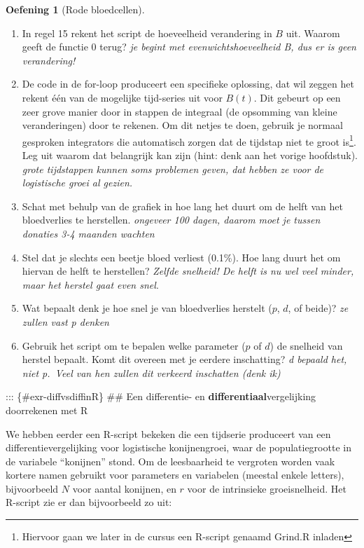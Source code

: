 \documentclass[
  a4paper,
]{scrbook}
\providecommand{\tightlist}{%
  \setlength{\itemsep}{0pt}\setlength{\parskip}{0pt}}\usepackage{longtable,booktabs,array}
\theoremstyle{definition}
\newtheorem{exercise}{Oefening}[chapter]
\theoremstyle{remark}
\begin{document}
\begin{exercise}[Rode
bloedcellen]
\begin{enumerate}
\def\labelenumi{\alph{enumi}.}
\setcounter{enumi}{7}
\tightlist
\item
  In regel 15 rekent het script de hoeveelheid verandering in \(B\) uit.
  Waarom geeft de functie \(0\) terug? \emph{je begint met
  evenwichtshoeveelheid B, dus er is geen verandering!}
\item
  De code in de for-loop produceert een specifieke oplossing, dat wil
  zeggen het rekent één van de mogelijke tijd-series uit voor \(B(t)\).
  Dit gebeurt op een zeer grove manier door in stappen de integraal (de
  opsomming van kleine veranderingen) door te rekenen. Om dit netjes te
  doen, gebruik je normaal gesproken integrators die automatisch zorgen
  dat de tijdstap niet te groot is\footnote{Hiervoor gaan we later in de
    cursus een R-script genaamd Grind.R inladen}. Leg uit waarom dat
  belangrijk kan zijn (hint: denk aan het vorige hoofdstuk). \emph{grote
  tijdstappen kunnen soms problemen geven, dat hebben ze voor de
  logistische groei al gezien.}
\item
  Schat met behulp van de grafiek in hoe lang het duurt om de helft van
  het bloedverlies te herstellen. \emph{ongeveer 100 dagen, daarom moet
  je tussen donaties 3-4 maanden wachten}
\item
  Stel dat je slechts een beetje bloed verliest (0.1\%). Hoe lang duurt
  het om hiervan de helft te herstellen? \emph{Zelfde snelheid! De helft
  is nu wel veel minder, maar het herstel gaat even snel}.
\item
  Wat bepaalt denk je hoe snel je van bloedverlies herstelt (\(p\),
  \(d\), of beide)? \emph{ze zullen vast p denken}
\item
  Gebruik het script om te bepalen welke parameter (\(p\) of \(d\)) de
  snelheid van herstel bepaalt. Komt dit overeen met je eerdere
  inschatting? \emph{d bepaald het, niet p.~Veel van hen zullen dit
  verkeerd inschatten (denk ik) }
\end{enumerate}

\end{exercise}

::: \{\#exr-diffvsdiffinR\} \#\# Een differentie- en
\textbf{differentiaal}vergelijking doorrekenen met R

We hebben eerder een R-script bekeken die een tijdserie produceert van
een differentievergelijking voor logistische konijnengroei, waar de
populatiegrootte in de variabele ``konijnen'' stond. Om de leesbaarheid
te vergroten worden vaak kortere namen gebruikt voor parameters en
variabelen (meestal enkele letters), bijvoorbeeld \(N\) voor aantal
konijnen, en \(r\) voor de intrinsieke groeisnelheid. Het R-script zie
er dan bijvoorbeeld zo uit:
\end{document}
